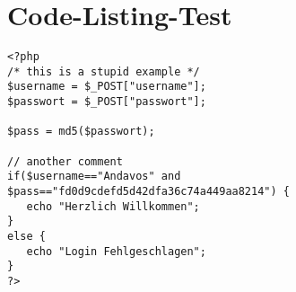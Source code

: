 \section{Code-Listing-Test}
\begin{lstlisting}
<?php
/* this is a stupid example */
$username = $_POST["username"];
$passwort = $_POST["passwort"];

$pass = md5($passwort);

// another comment
if($username=="Andavos" and
$pass=="fd0d9cdefd5d42dfa36c74a449aa8214") {
   echo "Herzlich Willkommen";
}
else {
   echo "Login Fehlgeschlagen";
}
?>
\end{lstlisting}

\clearpage
\newpage